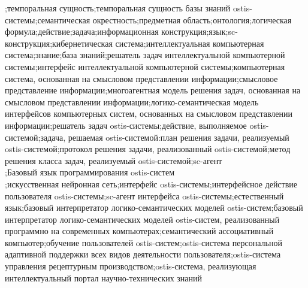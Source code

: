 \begin{SCn}
\begin{scnsubstruct}
{\begin{scnset}
;темпоральная сущность;темпоральная сущность базы знаний ostis-системы;семантическая окрестность;предметная область;онтология;логическая формула;действие;задача;информационная конструкция;язык;sc-конструкция;кибернетическая система;интеллектуальная компьютерная система;знание;база знаний;решатель задач интеллектуальной компьютерной системы;интерфейс интеллектуальной компьютерной системы;компьютерная система, основанная на смысловом представлении информации;смысловое представление информации;многоагентная модель решения задач, основанная на смысловом представлении информации;логико-семантическая модель интерфейсов компьютерных систем, основанных на смысловом представлении информации;решатель задач ostis-системы;действие, выполняемое ostis-системой;задача, решаемая ostis-системой:план решения задачи, реализуемый ostis-системой;протокол решения задачи, реализованный ostis-системой;метод решения класса задач, реализуемый ostis-системой;sc-агент\\
;Базовый язык программирования ostis-систем\\
;искусственная нейронная сеть;интерфейс ostis-системы;интерфейсное действие пользователя ostis-системы;sc-агент интерфейса ostis-системы;естественный язык;базовый интерпретатор логико-семантических моделей ostis-систем;базовый интерпретатор логико-семантических моделей ostis-систем, реализованный программно на современных компьютерах;семантический ассоциативный компьютер;обучение пользователей ostis-систем;ostis-система персональной адаптивной поддержки всех видов деятельности пользователя;ostis-система управления рецептурным производством;ostis-система, реализующая интеллектуальный портал научно-технических знаний
\end{scnset}
}
\end{scnsubstruct}
\end{SCn}
